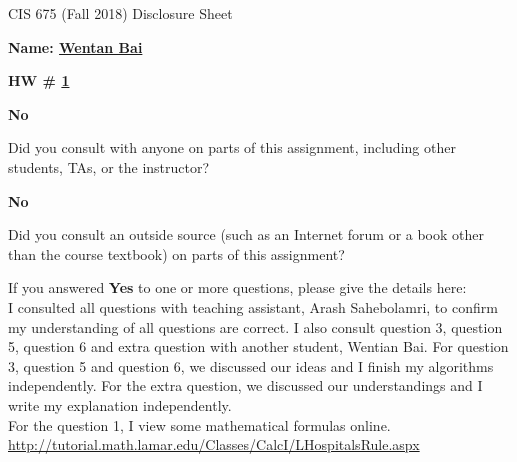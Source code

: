 \documentclass[12pt]{article}
\newcommand*\circled[1]{\tikz[baseline=(char.base)]{
            \node[shape=circle,draw,inner sep=2pt] (char) {#1};}}
\begin{document}
\begin{center}
  \Large
  CIS 675 (Fall 2018) Disclosure Sheet 
\end{center} 
\vspace*{2em}

\noindent
\textbf{\Large Name: \underline{ Wentan Bai }} 


\noindent 
\begin{minipage}[t]{1.0\linewidth}

\begin{minipage}[t]{0.25\linewidth}
\textbf{\Large
  HW \# \underline{ 1 }
} 

\end{minipage} \vspace*{3ex}




\begin{minipage}[t]{.8in}
  \textbf{\circled{Yes} \quad No}
\end{minipage}
\qquad 
\begin{minipage}[t]{5.5in}
  Did you consult with anyone on parts of this assignment, including other students, TAs, or the instructor? 
\end{minipage}
\vspace*{1ex}

\begin{minipage}[t]{.8in}
  \textbf{\circled{Yes} \quad No}
\end{minipage}
\qquad 
\begin{minipage}[t]{5.5in}
  Did you consult an outside source (such as an Internet forum or a
  book other than the course textbook) on parts of this assignment? 
\end{minipage}
\vspace*{1ex}

\noindent
  If you answered \textbf{Yes} to one or more questions, please give the details here: \vspace*{5ex} \\
  I consulted all questions with teaching assistant, Arash Sahebolamri, to confirm my understanding of all questions are correct. 
  I also consult question 3, question 5, question 6 and extra question with another student, Wentian Bai. For question 3, question 5 and question 6, we discussed our ideas and I finish my algorithms independently. 
  For the extra question, we discussed our understandings and I write my explanation independently.  \vspace*{5ex} \\

  For the question 1, I view some mathematical formulas online. \\ \href{url}{http://tutorial.math.lamar.edu/Classes/CalcI/LHospitalsRule.aspx}


\vfill
\end{minipage}
\end{document}
